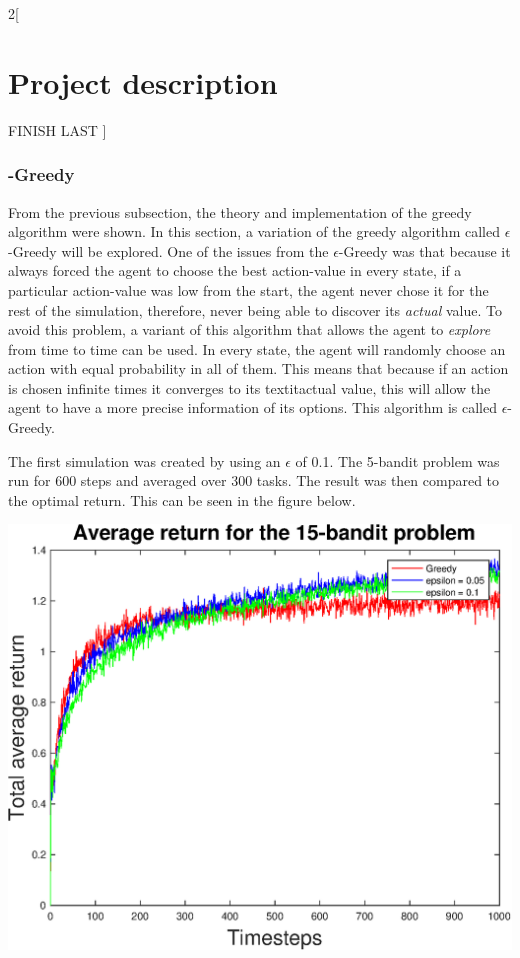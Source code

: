 \documentclass[a4paper]{article}
\newenvironment{Figure}
{\par\medskip\noindent\minipage{\linewidth}}
{\endminipage\par\medskip}
\begin{document}
\begin{multicols}{2}[
		\section*{Project description}
		FINISH LAST
		]
		\subsubsection{-Greedy}
		
		From the previous subsection, the theory and implementation of the greedy algorithm were shown. In this section, a variation of the greedy algorithm called $\epsilon$-Greedy will be explored. One of the issues from the $\epsilon$-Greedy was that because it always forced the agent to choose the best action-value in every state, if a particular action-value was low from the start, the agent never chose it for the rest of the simulation, therefore, never being able to discover its \textit{actual} value. To avoid this problem, a variant of this algorithm that allows the agent to \textit{explore} from time to time can be used. In every state, the agent will randomly choose an action with equal probability in all of them. This means that because if an action is chosen infinite times it converges to its textit{actual} value, this will allow the agent to have a more precise information of its options. This algorithm is called $\epsilon$-Greedy.
		
		The first simulation was created by using an $\epsilon$ of 0.1. The 5-bandit problem was run for 600 steps and averaged over 300 tasks. The result was then compared to the optimal return. This can be seen in the figure below.
	
		\begin{Figure}
			\centering
			\includegraphics[width=\linewidth]{allplots1.eps}
		\end{Figure}
		

\end{multicols}
\end{document}
